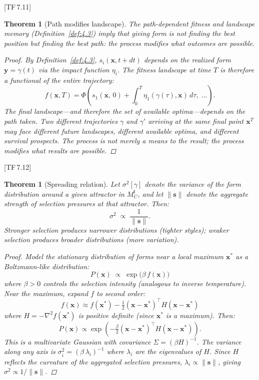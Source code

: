\documentclass[10pt]{article}
\theoremstyle{definition}
\theoremstyle{plain}
\newtheorem{theorem}[definition]{Theorem}
\theoremstyle{remark}
\newcommand{\MC}{M^{\mathsf{I}}_C}          %
\newcommand{\norm}[1]{\lVert #1 \rVert}
\newcommand{\TF}[1]{\textnormal{[TF\,#1]}}  %
\begin{document}
\TF{7.11}

\begin{theorem}[Path modifies landscape]\label{thm:9.3}
The path-dependent fitness and landscape memory (Definition~\ref{def:4.3})
imply that giving form is not finding the best position but finding the
best \emph{path}: the process modifies what outcomes are possible.

\begin{proof}
By Definition~\ref{def:4.3}, $s_i(\bm{x}, t+dt)$ depends on the
realized form $\bm{y} = \gamma(t)$ via the impact function $\eta_i$.
The fitness landscape at time $T$ is therefore a functional of the
entire trajectory:
\[
  f(\bm{x}, T) = \Phi\!\left(
    s_1\!\left(\bm{x},\, 0\right) +
    \int_0^T \eta_1(\gamma(\tau), \bm{x})\, d\tau,\;
    \ldots
  \right).
\]
The final landscape---and therefore the set of available optima---depends
on the path taken. Two different trajectories $\gamma$ and $\gamma'$
arriving at the same final point $\bm{x}^T$ may face different future
landscapes, different available optima, and different survival
prospects. The process is not merely a means to the result; the process
\emph{modifies} what results are possible. \qedhere
\end{proof}
\end{theorem}

\TF{7.12}

\begin{theorem}[Spreading relation]\label{thm:9.4}
Let $\sigma^2[\gamma]$ denote the variance of the form distribution
around a given attractor in $\MC$, and let $\norm{\bm{s}}$ denote the
aggregate strength of selection pressures at that attractor. Then:
\[
  \sigma^2 \;\propto\; \frac{1}{\norm{\bm{s}}}.
\]
Stronger selection produces narrower distributions (tighter styles);
weaker selection produces broader distributions (more variation).

\begin{proof}
Model the stationary distribution of forms near a local maximum
$\bm{x}^*$ as a Boltzmann-like distribution:
\[
  P(\bm{x}) \;\propto\; \exp\!\bigl(\beta \, f(\bm{x})\bigr)
\]
where $\beta > 0$ controls the selection intensity (analogous to
inverse temperature). Near the maximum, expand $f$ to second order:
\[
  f(\bm{x}) \approx f(\bm{x}^*) - \tfrac{1}{2}
  (\bm{x} - \bm{x}^*)^\top H (\bm{x} - \bm{x}^*)
\]
where $H = -\nabla^2 f(\bm{x}^*)$ is positive definite (since
$\bm{x}^*$ is a maximum). Then:
\[
  P(\bm{x}) \propto \exp\!\left(
    -\tfrac{\beta}{2}
    (\bm{x} - \bm{x}^*)^\top H (\bm{x} - \bm{x}^*)
  \right).
\]
This is a multivariate Gaussian with covariance
$\Sigma = (\beta H)^{-1}$. The variance along any axis is
$\sigma_i^2 = (\beta \, \lambda_i)^{-1}$ where $\lambda_i$ are the
eigenvalues of $H$. Since $H$ reflects the curvature of the aggregated
selection pressures, $\lambda_i \propto \norm{\bm{s}}$, giving
$\sigma^2 \propto 1/\norm{\bm{s}}$. \qedhere
\end{proof}
\end{theorem}
\end{document}
